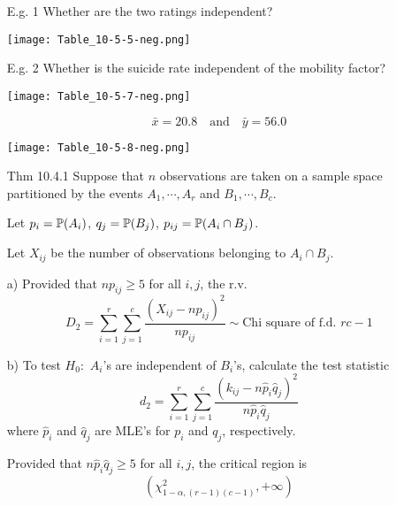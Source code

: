 \begin{frame}[2-]
	\begin{enumerate}
		\item[E.g. 1] Whether are the two ratings independent?
			\vfill
			\begin{center}
				\texttt{[image: Table\_10-5-5-neg.png]}
			\end{center}
	\end{enumerate}
\end{frame}
\begin{frame}[2,4]
	\begin{enumerate}
		\item[E.g. 2] Whether is the suicide rate independent of the mobility factor?
			\vfill
			\begin{center}
				\texttt{[image: Table\_10-5-7-neg.png]}
			\end{center}
			\pause
		\item[]\[
				\bar{x} = 20.8\quad\text{and}\quad \bar{y} = 56.0
			\]
			\begin{center}
				\texttt{[image: Table\_10-5-8-neg.png]}
			\end{center}
	\end{enumerate}
\end{frame}
\begin{frame}
	\begin{enumerate}
		\item[Thm \small 10.4.1] Suppose that $n$ observations are taken on a sample space partitioned by the
			events $A_1,\cdots, A_r$ and $B_1,\cdots,B_c$. \\[1em]
		\item[] Let $p_i=\mathbb{P}(A_i)$, $q_j = \mathbb{P}(B_j)$, $p_{ij} = \mathbb{P}(A_i\cap B_j)$.\\[1em]
		\item[] Let $X_{ij}$ be the number of observations belonging to $A_i\cap B_j$.
			\vfill
		\item[a)] Provided that $np_{ij}\ge 5$ for all $i,j$, the r.v.
			\[
				D_2 = \sum_{i=1}^r \sum_{j=1}^c  \frac{\left(X_{ij}-np_{ij} \right)^2}{np_{ij}} \sim \text{Chi square of f.d. $rc-1$}
			\]
			\vfill
		\item[b)] To test $H_0:$ $A_i$'s are independent of $B_i$'s, calculate the test statistic
			\[
				d_2 = \sum_{i=1}^r \sum_{j=1}^c  \frac{\left(k_{ij}-n\hat p_{i}\hat q_j \right)^2}{n\hat p_{i}\hat q_j}
			\]
			where $\hat p_i$ and $\hat q_j$ are MLE's for $p_i$ and $q_j$, respectively.\\[1em]
		\item[] Provided that $n\hat p_i \hat q_j\ge 5$ for all $i,j$, the critical region is
			\[
				(\chi^2_{1-\alpha,(r-1)(c-1)},+\infty)
			\]
	\end{enumerate}
\end{frame}
